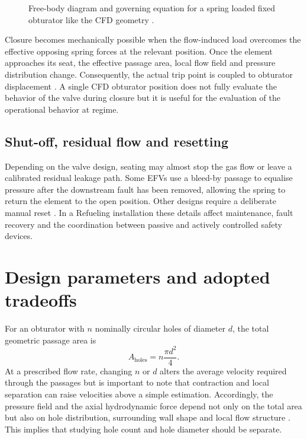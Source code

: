 \begin{figure}[htbp]
\centering
\resizebox{0.95\textwidth}{!}{}
\caption{Free-body diagram and governing equation for a spring loaded fixed obturator like the CFD geometry \cite{white2016,moukalled2016}.}
\label{fig:efv_force_balance}
\end{figure}

Closure becomes mechanically possible when the flow-induced load overcomes the effective opposing spring forces at the relevant position. Once the element approaches its seat, the effective passage area, local flow field and pressure distribution change. Consequently, the actual trip point is coupled to obturator displacement \cite{white2016,moukalled2016}.
A single CFD obturator position does not fully evaluate the behavior of the valve during closure but it is useful for the evaluation of the operational behavior at regime. 

\subsection{Shut-off, residual flow and resetting}

Depending on the valve design, seating may almost stop the gas flow or leave a calibrated residual leakage path. Some EFVs use a bleed-by passage to equalise pressure after the downstream fault has been removed, allowing the spring to return the element to the open position. Other designs require a deliberate manual reset \cite{honeywell_efv,linde_efv,teco_efv}. In a Refueling installation these details affect maintenance, fault recovery and the coordination between passive and actively controlled safety devices.

\section{Design parameters and adopted tradeoffs}
\label{sec:efv_design_parameters}

For an obturator with $n$ nominally circular holes of diameter $d$, the total geometric passage area is
\begin{equation}
A_{\mathrm{holes}}=n\frac{\pi d^2}{4}.
\label{eq:efv_open_area}
\end{equation}
At a prescribed flow rate, changing $n$ or $d$ alters the average velocity required through the passages but is important to note that contraction and local separation can raise velocities above a simple estimation. Accordingly, the pressure field and the axial hydrodynamic force depend not only on the total area but also on hole distribution, surrounding wall shape and local flow structure \cite{crane410,white2016}. This implies that studying hole count and hole diameter should be separate.

